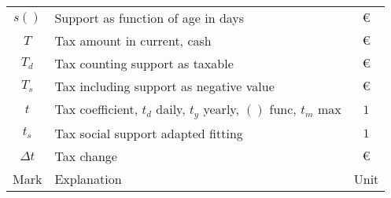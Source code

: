 \begin{center}
\begin{supertabular}{ c l c }
$ s()	$& Support as function of age in days		&$ \euro	$\\
$ T	$& Tax amount in current, cash			&$ \euro	$\\
$ T_d	$& Tax counting support as taxable		&$ \euro	$\\
$ T_s	$& Tax including support as negative value	&$ \euro	$\\
$t$&Tax coefficient, $t_d$ daily, $t_y$ yearly, $()$ func, $t_m$ max&$ 1$\\
$ t_s	$& Tax social support adapted fitting		&$ 1		$\\
$\Delta t$& Tax change					&$ \euro	$\\
\hline
  Mark		 & Explanation				&  Unit		 \\
\end{supertabular}
\end{center}
